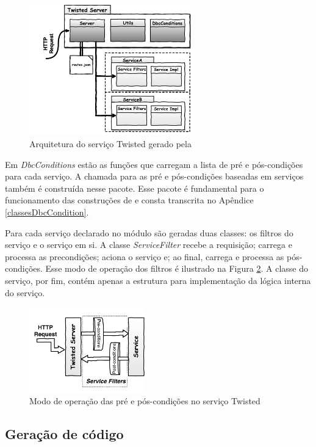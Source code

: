 \begin{figure}[htb]
\centering
\includegraphics[width=70mm,trim = 18mm 4mm 0mm
0mm,clip]{img/TwistedServer.pdf}
\caption{Arquitetura do serviço Twisted gerado pela \neoidl{}}
\label{Fig:TwistedArchtecture}
\end{figure}

Em \emph{DbcConditions} estão as funções que carregam a lista de pré e
pós-condições para cada serviço. A chamada para as pré e pós-condições baseadas
em serviços também é construída nesse pacote. Esse pacote é fundamental para o
funcionamento das cons\-tru\-ções de \designbycontract{} e consta transcrita no
Apêndice \ref{classesDbcCondition}.

Para cada serviço declarado no módulo \neoidl{} são geradas duas classes: os
filtros do serviço e o serviço em si. A classe \emph{ServiceFilter} recebe a
requisição; carrega e processa as precondições; aciona o serviço e; ao final,
carrega e processa as pós-condições. Esse modo de operação dos filtros é
ilustrado na Figura \ref{Fig:TwistedFiltes}. A classe do serviço, por
fim, contém apenas a estrutura para implementação da lógica interna do serviço.

\begin{figure}[!htb]
\centering
\includegraphics[width=50mm,trim = 5mm 6mm 0mm 
3mm,clip]{img/TwistedFilters.pdf}
\caption{Modo de operação das pré e pós-condições no serviço Twisted}
\label{Fig:TwistedFiltes}
\end{figure}

\subsection{Geração de código}

